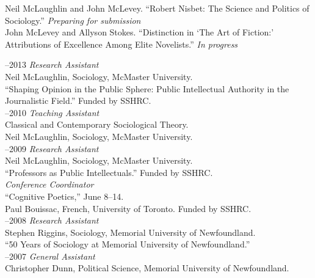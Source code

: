 \documentclass[11pt,usenames,dvipsnames]{article}
\begin{document}
\ind Neil McLaughlin and John McLevey. ``Robert Nisbet: The Science and Politics of Sociology.'' \emph{Preparing for submission} \\

\ind John McLevey and Allyson Stokes. ``Distinction in `The Art of Fiction:' Attributions of Excellence Among Elite Novelists.'' \emph{In progress} \\



–2013 {\it Research Assistant}\\
Neil McLaughlin, Sociology, McMaster University.\\ 
``Shaping Opinion in the Public Sphere: Public Intellectual Authority in the Journalistic Field.'' Funded by SSHRC.\\

–2010 {\it Teaching Assistant}\\
Classical and Contemporary Sociological Theory.\\
Neil McLaughlin, Sociology, McMaster University.\\

–2009 {\it Research Assistant}\\
Neil McLaughlin, Sociology, McMaster University.\\ 
``Professors as Public Intellectuals.'' Funded by SSHRC.\\

 {\it Conference Coordinator}\\
``Cognitive Poetics,'' June 8–14.\\ 
Paul Bouissac, French, University of Toronto. Funded by SSHRC.\\

–2008 {\it Research Assistant}\\
Stephen Riggins, Sociology, Memorial University of Newfoundland.\\ 
``50 Years of Sociology at Memorial University of Newfoundland.''\\

–2007 {\it General Assistant}\\
Christopher Dunn, Political Science, Memorial University of Newfoundland.\\


\end{document}
